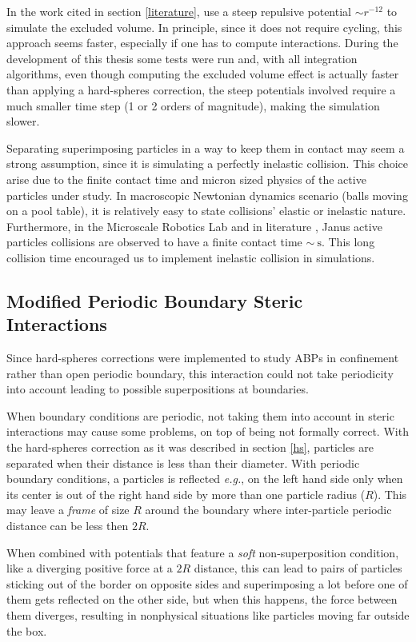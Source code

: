 \documentclass[../../master_thesis_np.tex]{subfiles}
\begin{document}
	In the work cited in section \ref{literature}, \citeauthor{martin-gomez_collective_2018} use a steep repulsive potential $\sim r^{-12}$ to simulate the excluded volume.
	In principle, since it does not require cycling, this approach seems faster, especially if one has to compute interactions.
	During the development of this thesis some tests were run and, with all integration algorithms, even though computing the excluded volume effect is actually faster than applying a hard-spheres correction, the steep potentials involved require a much smaller time step (1 or 2 orders of magnitude), making the simulation slower.
	
	Separating superimposing particles in a way to keep them in contact may seem a strong assumption, since it is simulating a perfectly inelastic collision.
	This choice arise due to the finite contact time and micron sized physics of the active particles under study.
	In macroscopic Newtonian dynamics scenario (balls moving on a pool table), it is relatively easy to state collisions' elastic or inelastic nature.
	Furthermore, in the Microscale Robotics Lab and in literature \cite{singh_pair_2024}, Janus active particles collisions are observed to have a finite contact time $\sim\SI{}{\second}$.
	This long collision time encouraged us to implement inelastic collision in simulations.
	
	\subsection{Modified Periodic Boundary Steric Interactions}
	Since hard-spheres corrections were implemented to study ABPs in confinement rather than open periodic boundary, this interaction could not take periodicity into account leading to possible superpositions at boundaries.
	
	When boundary conditions are periodic, not taking them into account in steric interactions may cause some problems, on top of being not formally correct.
	With the hard-spheres correction as it was described in section \ref{hs}, particles are separated when their distance is less than their diameter.
	With periodic boundary conditions, a particles is reflected {\it e.g.}, on the left hand side only when its center is out of the right hand side by more than one particle radius ($R$).
	This may leave a \emph{frame} of size $R$ around the boundary where inter-particle periodic distance can be less then $2R$. 
	
	When combined with potentials that feature a \emph{soft} non-superposition condition, like a diverging positive force at a $2R$ distance, this can lead to pairs of particles sticking out of the border on opposite sides and superimposing a lot before one of them gets reflected on the other side, but when this happens, the force between them diverges, resulting in nonphysical situations like particles moving far outside the box.
	
\end{document}
